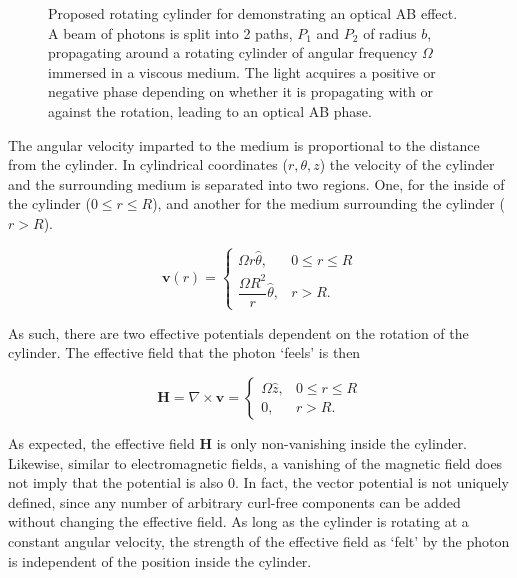\begin{figure}[t]
	\centering
	\def\svgwidth{0.6\textwidth}
	\begin{normalsize}
		
	\end{normalsize}
	\caption[A rotating medium analogue of the Aharonov-Bohm effect for light]{Proposed rotating cylinder for demonstrating an optical AB effect. A beam of photons is split into 2 paths, $P_1$ and $P_2$ of radius $b$, propagating around a rotating cylinder of angular frequency $\Omega$ immersed in a viscous medium. The light acquires a positive or negative phase depending on whether it is propagating with or against the rotation, leading to an optical AB phase.}
	\label{fig:abvieira}
\end{figure}

The angular velocity imparted to the medium is proportional to the distance from the cylinder. In cylindrical coordinates ($r, \theta, z$) the velocity of the cylinder and the surrounding medium is separated into two regions. One, for the inside of the cylinder ($0\leq r \leq R$), and another for the medium surrounding the cylinder ($r>R$).

\begin{equation}
\bm{v}(r) = 
\begin{cases}
\Omega r \hat{\theta}, & 0\leq r \leq R  \\
\dfrac{\Omega R^2}{r} \hat{\theta}, & r > R.
\end{cases}
\end{equation}

As such, there are two effective potentials dependent on the rotation of the cylinder. The effective field that the photon `feels' is then	

\begin{equation}
\bm{H} = \nabla \times \bm{v} = 
\begin{cases}
\Omega \hat{z}, & 0\leq r \leq R  \\
0, & r > R.
\end{cases}
\end{equation}

As expected, the effective field $\bm{H}$ is only non-vanishing inside the cylinder. Likewise, similar to electromagnetic fields, a vanishing of the magnetic field does not imply that the potential is also $0$. In fact, the vector potential is not uniquely defined, since any number of arbitrary curl-free components can be added without changing the effective field. As long as the cylinder is rotating at a constant angular velocity, the strength of the effective field as `felt' by the photon is independent of the position inside the cylinder.

